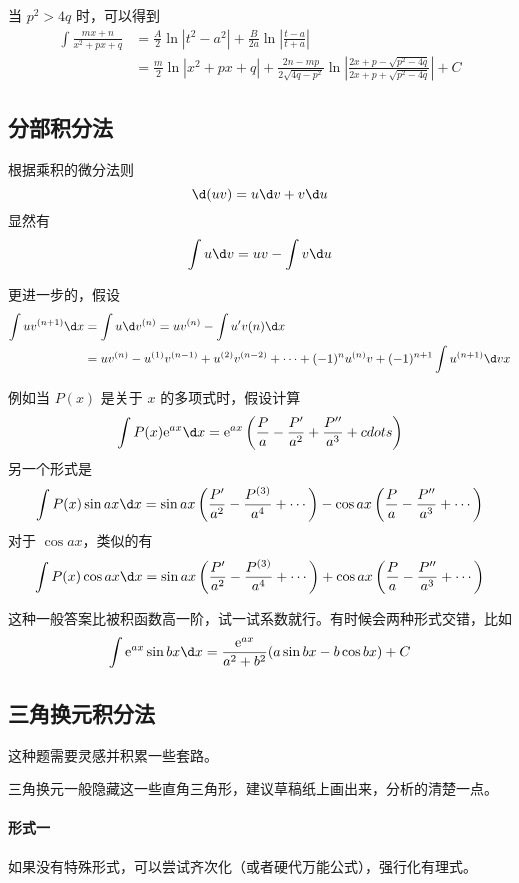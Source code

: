当 $p^2>4q$ 时，可以得到
\[
	\begin{aligned}
		\int \frac{mx+n}{x^2+px+q} & = \frac{A}{2} \ln|t^2 - a^2| + \frac{B}{2a}\ln\left|\frac{t-a}{t+a}\right|                                                  \\
		                           & =\frac{m}{2}\ln|x^2+px+q| + \frac{2n-mp}{2\sqrt{4q-p^2}}\ln\left| \frac{2x+p-\sqrt{p^2-4q}}{2x+p+\sqrt{p^2-4q}} \right| + C
	\end{aligned}
\]

\subsection{分部积分法}

根据乘积的微分法则
\[ \d(uv) = u \d v + v \d u \]
显然有
\[ \int u \d v = uv - \int v \d u \]

更进一步的，假设
\[ \begin{aligned}
		\int u v^{(n+1)} \d x & = \int u \d v^{(n)} = uv^{(n)} - \int u' v(n) \d x                                                                 \\
		                      & = u v^{(n)} - u^{(1)} v^{(n-1)} + u^{(2)} v^{(n-2)} + \cdots + (-1)^n u^{(n)} v + (-1)^{n+1} \int u^{(n+1)} \d v x
	\end{aligned} \]

例如当 $P(x)$ 是关于 $x$ 的多项式时，假设计算
\[ \int P(x) \ee^{ax} \d x = \ee^{ax} \left( \frac{P}{a} - \frac{P'}{a^2} + \frac{P''}{a^3} + cdots \right) \]
另一个形式是
\[ \int P(x) \sin ax \d x = \sin ax \left( \frac{P'}{a^2} - \frac{P^{(3)}}{a^4} + \cdots  \right) - \cos ax \left( \frac{P}{a} - \frac{P''}{a^3} + \cdots \right) \]
对于 $\cos ax$，类似的有
\[ \int P(x) \cos ax \d x = \sin ax \left( \frac{P'}{a^2} - \frac{P^{(3)}}{a^4} + \cdots  \right) + \cos ax \left( \frac{P}{a} - \frac{P''}{a^3} + \cdots \right) \]

这种一般答案比被积函数高一阶，试一试系数就行。有时候会两种形式交错，比如
\[ \int \ee^{ax} \sin bx \d x = \frac{\ee^{ax}}{a^2+b^2} (a \sin bx - b \cos bx) + C\]


\subsection{三角换元积分法}

这种题需要灵感并积累一些套路。

三角换元一般隐藏这一些直角三角形，建议草稿纸上画出来，分析的清楚一点。

\paragraph{形式一} 如果没有特殊形式，可以尝试齐次化（或者硬代万能公式），强行化有理式。

